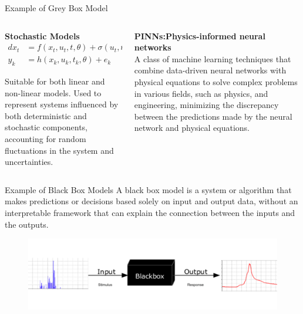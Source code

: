 \documentclass[aspectratio=169,hyperref={pdfpagelabels=false}]{beamer}
\begin{document}
\begin{frame}{Example of Grey Box Model}
  \begin{columns}
    \begin{column}{0.5\textwidth}
      \begin{tcolorbox}[width=1\linewidth, height = 1\linewidth]
      \textbf{Stochastic Models}
      \begin{align*}
        dx_t &= f(x_t, u_t, t, \theta) + \sigma(u_t, t, \theta)dw \\
        y_k  &= h(x_k, u_k, t_k, \theta) + e_k
      \end{align*}
    
      Suitable for both linear and non-linear models.  
      Used to represent systems influenced by both deterministic and stochastic components,
      accounting for random fluctuations in the system and uncertainties. \\
      \end{tcolorbox}\pause 

    \end{column}
    \begin{column}{0.5\textwidth}
      \begin{tcolorbox}[width=1\linewidth, height = 1\linewidth]
        \textbf{PINNs:Physics-informed neural networks} \\
        A class of machine learning techniques that combine data-driven neural
        networks with physical equations to solve complex problems in various fields,
        such as physics, and engineering, minimizing the discrepancy between the predictions made by the neural network and physical equations.
        \end{tcolorbox}
    \end{column}
\end{columns} 
\end{frame}

\begin{frame}{Example of Black Box Models}
  A black box model is a system or algorithm that makes predictions or decisions based solely on input and output data,
  without an interpretable framework that can explain the connection between the inputs and the outputs.
  \begin{figure}
    \centering
    \includegraphics[scale=0.5]{img/pic10.png}
  \end{figure}
\end{frame}
\end{document}
